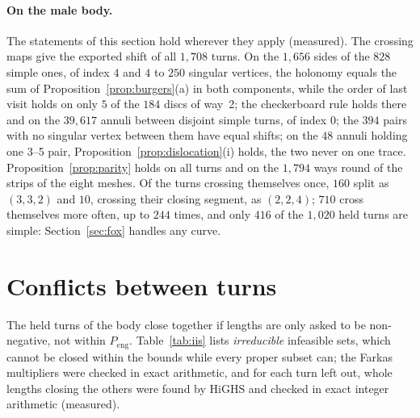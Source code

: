 \documentclass[11pt,a4paper]{article}
\begin{document}
\paragraph{On the male body.}
The statements of this section hold wherever they apply (measured). The
crossing maps give the exported shift of all $1{,}708$ turns. On the
$1{,}656$ sides of the $828$ simple ones, of index $4$ and $4$ to $250$
singular vertices, the holonomy equals the sum of
Proposition~\ref{prop:burgers}(a) in both components, while the order of
last visit holds on only $5$ of the $184$ discs of way~2; the checkerboard rule
holds there and on the $39{,}617$ annuli between disjoint simple turns, of
index $0$; the $394$ pairs with no singular vertex between them have equal
shifts; on the $48$ annuli holding one 3--5 pair,
Proposition~\ref{prop:dislocation}(i) holds, the two never on one trace.
Proposition~\ref{prop:parity} holds on all turns and on the $1{,}794$ ways
round of the strips of the eight meshes. Of the turns crossing themselves
once, $160$ split as $(3, 3, 2)$ and $10$, crossing their closing segment, as
$(2, 2, 4)$; $710$ cross themselves more often, up to $244$ times, and only
$416$ of the $1{,}020$ held turns are simple: Section~\ref{sec:fox} handles
any curve.

\section{Conflicts between turns}\label{sec:conflicts}

The held turns of the body close together if lengths are only asked to be
non-negative, not within $P_{\mathrm{eng}}$. Table~\ref{tab:iis} lists
\emph{irreducible} infeasible sets, which cannot be closed within the bounds
while every proper subset can; the Farkas multipliers were checked in exact
arithmetic, and for each turn left out, whole lengths closing the others were
found by HiGHS and checked in exact integer arithmetic (measured).
\end{document}
